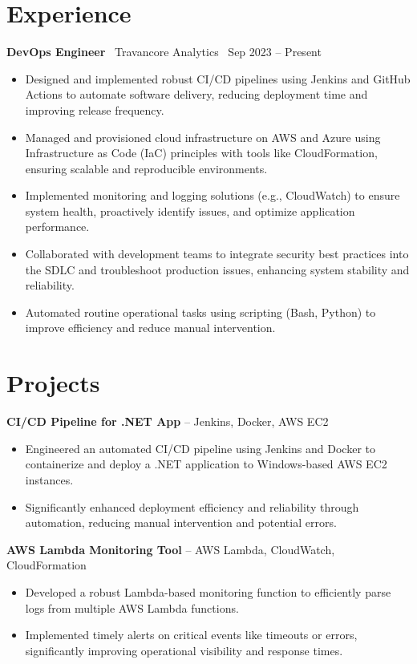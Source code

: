\documentclass[a4paper,10pt]{article}
\begin{document}
\section*{Experience}
\textbf{DevOps Engineer} \
Travancore Analytics \ \hfill Sep 2023 – Present
\begin{itemize}[leftmargin=0.5in, label=\textbullet]
    \item Designed and implemented robust CI/CD pipelines using Jenkins and GitHub Actions to automate software delivery, reducing deployment time and improving release frequency.
    \item Managed and provisioned cloud infrastructure on AWS and Azure using Infrastructure as Code (IaC) principles with tools like CloudFormation, ensuring scalable and reproducible environments.
    \item Implemented monitoring and logging solutions (e.g., CloudWatch) to ensure system health, proactively identify issues, and optimize application performance.
    \item Collaborated with development teams to integrate security best practices into the SDLC and troubleshoot production issues, enhancing system stability and reliability.
    \item Automated routine operational tasks using scripting (Bash, Python) to improve efficiency and reduce manual intervention.
\end{itemize}


\section*{Projects}
\textbf{CI/CD Pipeline for .NET App} – Jenkins, Docker, AWS EC2
\begin{itemize}[leftmargin=0.25in, label=\textbullet]
    \item Engineered an automated CI/CD pipeline using Jenkins and Docker to containerize and deploy a .NET application to Windows-based AWS EC2 instances.
    \item Significantly enhanced deployment efficiency and reliability through automation, reducing manual intervention and potential errors.
\end{itemize}

\textbf{AWS Lambda Monitoring Tool} – AWS Lambda, CloudWatch, CloudFormation
\begin{itemize}[leftmargin=0.25in, label=\textbullet]
    \item Developed a robust Lambda-based monitoring function to efficiently parse logs from multiple AWS Lambda functions.
    \item Implemented timely alerts on critical events like timeouts or errors, significantly improving operational visibility and response times.
\end{itemize}
\end{document}
